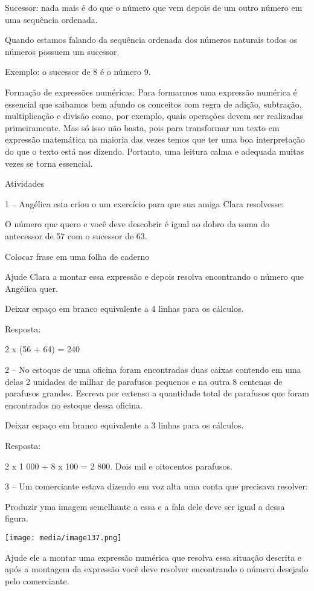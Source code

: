Sucessor: nada mais é do que o número que vem depois de um outro número
em uma sequência ordenada.

Quando estamos falando da sequência ordenada dos números naturais todos
os números possuem um sucessor.

Exemplo: o sucessor de 8 é o número 9.

Formação de expressões numéricas: Para formarmos uma expressão numérica
é essencial que saibamos bem afundo os conceitos com regra de adição,
subtração, multiplicação e divisão como, por exemplo, quais operações
devem ser realizadas primeiramente. Mas só isso não basta, pois para
transformar um texto em expressão matemática na maioria das vezes temos
que ter uma boa interpretação do que o texto está nos dizendo. Portanto,
uma leitura calma e adequada muitas vezes se torna essencial.

Atividades

1 -- Angélica esta criou o um exercício para que sua amiga Clara
resolvesse:

O número que quero e você deve descobrir é igual ao dobro da soma do
antecessor de 57 com o sucessor de 63.

Colocar frase em uma folha de caderno

Ajude Clara a montar essa expressão e depois resolva encontrando o
número que Angélica quer.

Deixar espaço em branco equivalente a 4 linhas para os cálculos.

Resposta:

2 x (56 + 64) = 240

2 -- No estoque de uma oficina foram encontradas duas caixas contendo em
uma delas 2 unidades de milhar de parafusos pequenos e na outra 8
centenas de parafusos grandes. Escreva por extenso a quantidade total de
parafusos que foram encontrados no estoque dessa oficina.

Deixar espaço em branco equivalente a 3 linhas para os cálculos.

Resposta:

2 x 1 000 + 8 x 100 = 2 800. Dois mil e oitocentos parafusos.

3 -- Um comerciante estava dizendo em voz alta uma conta que precisava
resolver:

Produzir yma imagem semelhante a essa e a fala dele deve ser igual a
dessa figura.

\texttt{[image: media/image137.png]}

Ajude ele a montar uma expressão numérica que resolva essa situação
descrita e após a montagem da expressão você deve resolver encontrando o
número desejado pelo comerciante.

